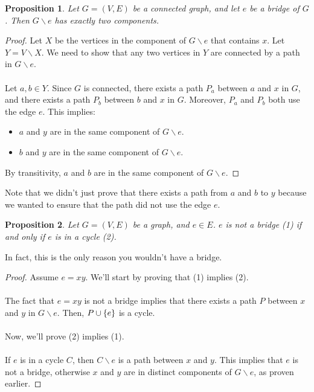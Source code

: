 \documentclass[]{article}
\newtheorem*{proposition}{Proposition}
\theoremstyle{definition}
\DeclarePairedDelimiter{\set}{\lbrace}{\rbrace}
\begin{document}
				\begin{proposition}
					Let $G = (V, E)$ be a connected graph, and let $e$ be a bridge of $G$. Then $G \backslash e$ has exactly two components.
				\end{proposition}

				\begin{proof}
					Let $X$ be the vertices in the component of $G \backslash e$ that contains $x$. Let $Y = V \backslash X$. We need to show that any two vertices in $Y$ are connected by a path in $G \backslash e$.
					\\ \\
					Let $a, b \in Y$. Since $G$ is connected, there exists a path $P_a$ between $a$ and $x$ in $G$, and there exists a path $P_b$ between $b$ and $x$ in $G$. Moreover, $P_a$ and $P_b$ both use the edge $e$. This implies:
					\begin{itemize}
						\item $a$ and $y$ are in the same component of $G \backslash e$.
						\item $b$ and $y$ are in the same component of $G \backslash e$.
					\end{itemize}

					By transitivity, $a$ and $b$ are in the same component of $G \backslash e$.
				\end{proof}

				Note that we didn't just prove that there exists a path from $a$ and $b$ to $y$ because we wanted to ensure that the path did not use the edge $e$.

				\begin{proposition}
					Let $G = (V, E)$ be a graph, and $e \in E$. $e$ is \emph{not} a bridge (1) if and only if $e$ is in a cycle (2).
				\end{proposition}
				
				In fact, this is the only reason you wouldn't have a bridge.

				\begin{proof}
					Assume $e = xy$. We'll start by proving that (1) implies (2).
					\\ \\
					The fact that $e = xy$ is not a bridge implies that there exists a path $P$ between $x$ and $y$ in $G \backslash e$. Then, $P \cup \set{e}$ is a cycle.
					\\ \\
					Now, we'll prove (2) implies (1).
					\\ \\
					If $e$ is in a cycle $C$, then $C \backslash e$ is a path between $x$ and $y$. This implies that $e$ is not a bridge, otherwise $x$ and $y$ are in distinct components of $G \backslash e$, as proven earlier.
				\end{proof}
\end{document}
